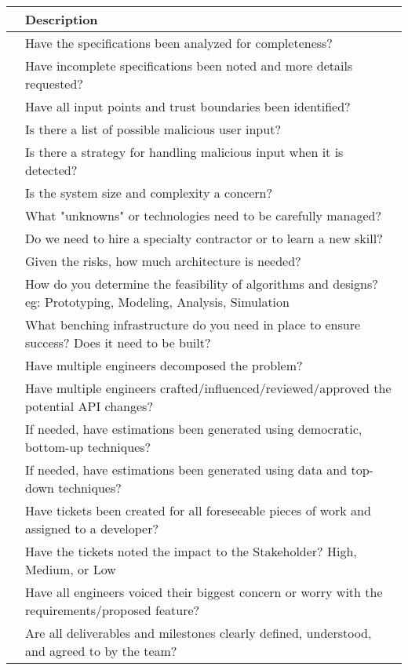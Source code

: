 \documentclass{article}
\begin{document}
\begin{center}
    \begin{tabular}{ | p{.25cm} || p{10cm} |}
    \hline
     & Description \\ \hline
     & Have the specifications been analyzed for completeness? \\ \hline
     & Have incomplete specifications been noted and more details requested? \\ \hline
     & Have all input points and trust boundaries been identified? \\ \hline
     & Is there a list of possible malicious user input? \\ \hline
     & Is there a strategy for handling malicious input when it is detected? \\ \hline
     & Is the system size and complexity a concern? \\ \hline
     & What "unknowns" or technologies need to be carefully managed? \\ \hline
     & Do we need to hire a specialty contractor or to learn a new skill? \\ \hline
     & Given the risks, how much architecture is needed? \\ \hline
     & How do you determine the feasibility of algorithms and designs? eg: Prototyping, Modeling, Analysis, Simulation  \\ \hline
     & What benching infrastructure do you need in place to ensure success? Does it need to be built? \\ \hline
     & Have multiple engineers decomposed the problem? \\ \hline
     & Have multiple engineers crafted/influenced/reviewed/approved the potential API changes? \\ \hline
     & If needed, have estimations been generated using democratic, bottom-up techniques? \\ \hline
     & If needed, have estimations been generated using data and top-down techniques? \\ \hline
     & Have tickets been created for all foreseeable pieces of work and assigned to a developer? \\ \hline
     & Have the tickets noted the impact to the Stakeholder? High, Medium, or Low \\ \hline
     & Have all engineers voiced their biggest concern or worry with the requirements/proposed feature? \\ \hline
     & Are all deliverables and milestones clearly defined, understood, and agreed to by the team? \\ \hline

\end{tabular}
\end{center}
\end{document}
